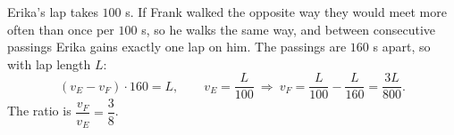 Erika's lap takes $100$ s. If Frank walked the opposite way they would meet more often than once per $100$ s, so he walks the same way, and between consecutive passings Erika gains exactly one lap on him. The passings are $160$ s apart, so with lap length $L$:
\[(v_E-v_F)\cdot160=L,\qquad v_E=\dfrac L{100}\ \Rightarrow\ v_F=\dfrac L{100}-\dfrac L{160}=\dfrac{3L}{800}.\]
The ratio is $\dfrac{v_F}{v_E}=\boxed{\dfrac38}$.

